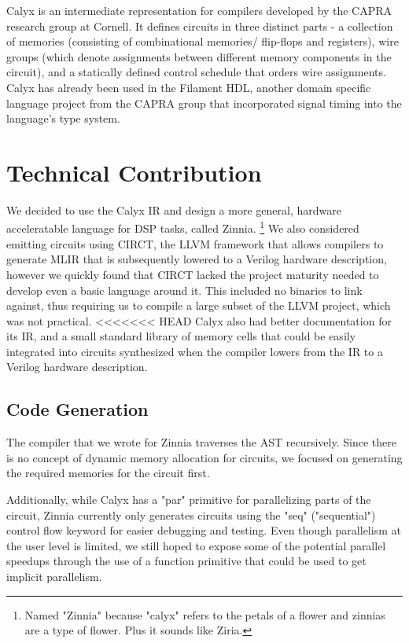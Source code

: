 \documentclass[12pt]{article}
\begin{document}
Calyx is an intermediate representation for compilers developed by the CAPRA research group at Cornell.
It defines circuits in three distinct parts - a collection of memories (consisting of combinational memories/
flip-flops and registers), wire groups (which denote assignments between different memory components
in the circuit), and a statically defined control schedule that orders wire assignments.
Calyx has already been used in the Filament HDL, another domain specific language project from the CAPRA
group that incorporated signal timing into the language's type system.

\section{Technical Contribution}
We decided to use the Calyx IR and design a more general, hardware acceleratable language for DSP tasks, called Zinnia.
\footnote{Named "Zinnia" because "calyx" refers to the petals of a flower and zinnias are a type of flower. Plus it sounds like Ziria.}
We also considered emitting circuits using CIRCT, the LLVM framework that allows compilers to generate
MLIR that is subsequently lowered to a Verilog hardware description, however we quickly found that
CIRCT lacked the project maturity needed to develop even a basic language around it. This included
no binaries to link against, thus requiring us to compile a large subset of the LLVM project, which was not practical.
<<<<<<< HEAD
Calyx also had better documentation for its IR, and a small standard library of memory cells that could be easily integrated
into circuits synthesized when the compiler lowers from the IR to a Verilog hardware description.
\subsection{Code Generation}
The compiler that we wrote for Zinnia traverses the AST recursively. Since there is no concept of dynamic
memory allocation for circuits, we focused on generating the required memories for the circuit first.

Additionally, while Calyx has a "par" primitive for parallelizing parts of the circuit, Zinnia currently only generates
circuits using the "seq" ("sequential") control flow keyword for easier debugging and testing. Even though parallelism
at the user level is limited, we still hoped to expose some of the potential parallel speedups through the use
of a function primitive that could be used to get implicit parallelism.
\end{document}
